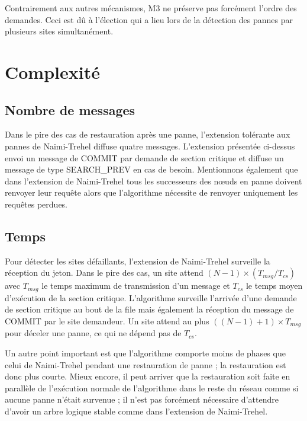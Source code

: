 Contrairement aux autres mécanismes, M3 ne préserve pas forcément l'ordre des demandes. Ceci est dû à l'élection qui a lieu lors de la détection des pannes par plusieurs sites simultanément.


\section{Complexité}

\subsection{Nombre de messages}
Dans le pire des cas de restauration après une panne, l'extension tolérante aux pannes de Naimi-Trehel \cite{naimi1988} diffuse quatre messages. L'extension présentée ci-dessus envoi un message de COMMIT par demande de section critique et diffuse un message de type SEARCH\_PREV en cas de besoin. Mentionnons également que dans l'extension de Naimi-Trehel tous les successeurs des nœuds en panne doivent renvoyer leur requête alors que l'algorithme \cite{sopena2005} nécessite de renvoyer uniquement les requêtes perdues.

\subsection{Temps}
Pour détecter les sites défaillants, l'extension de Naimi-Trehel surveille la réception du jeton. Dans le pire des cas, un site attend $(N-1)\times(T_{msg}/T_{cs})$ avec $T_{msg}$ le temps maximum de transmission d'un message et $T_{cs}$ le temps moyen d'exécution de la section critique.
L'algorithme \cite{sopena2005} surveille l'arrivée d'une demande de section critique au bout de la file mais également la réception du message de COMMIT par le site demandeur. Un site attend au plus $((N-1)+1)\times T_{msg}$ pour déceler une panne, ce qui ne dépend pas de $T_{cs}$.

Un autre point important est que l'algorithme \cite{sopena2005} comporte moins de phases que celui de Naimi-Trehel pendant une restauration de panne ; la restauration est donc plus courte. Mieux encore, il peut arriver que la restauration soit faite en parallèle de l'exécution normale de l'algorithme dans le reste du réseau comme si aucune panne n'était survenue ; il n'est pas forcément nécessaire d'attendre d'avoir un arbre logique stable comme dans l'extension de Naimi-Trehel.


